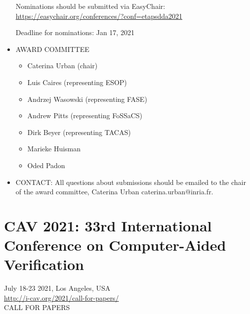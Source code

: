 \documentclass{article}
\begin{document}
\begin{itemize}
  Nominations should be submitted via EasyChair: \href{https://easychair.org/conferences/?conf=etapsdda2021}{https://easychair.org/conferences/?conf=etapsdda2021} 
 
Deadline for nominations: Jan 17, 2021 
 
\item  AWARD COMMITTEE 
 
\begin{itemize}\item  Caterina Urban (chair)
\item  Luis Caires (representing ESOP)
\item  Andrzej Wasowski (representing FASE)
\item  Andrew Pitts (representing FoSSaCS)
\item  Dirk Beyer (representing TACAS)
\item  Marieke Huisman
\item  Oded Padon
\end{itemize} 
\item  CONTACT: All questions about submissions should be emailed to the chair of the award committee, Caterina Urban caterina.urban@inria.fr. 
 
\end{itemize}\section{CAV 2021: 33rd International Conference on Computer-Aided Verification}\label{CAV2021}  July 18-23 2021, Los Angeles, USA\\ 
  \href{http://i-cav.org/2021/call-for-papers/}{http://i-cav.org/2021/call-for-papers/} \\ 
CALL FOR PAPERS 
\end{document}
